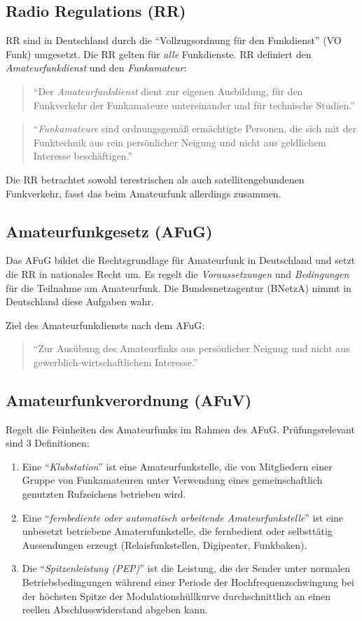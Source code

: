 \documentclass[11pt,BCOR=8.5mm]{scrartcl}
\begin{document}
\subsection{Radio Regulations (RR)}
RR sind in Deutschland durch die "`Vollzugsordnung für den Funkdienst"'
(VO Funk) umgesetzt. Die RR gelten für \emph{alle} Funkdienste.  
RR definiert den \emph{Amateurfunkdienst} und den \emph{Funkamateur}:
\begin{quote}
  "`Der \emph{Amateurfunkdienst} dient zur eigenen Ausbildung, für den
  Funkverkehr der Funkamateure untereinander und für technische
  Studien."'
\end{quote}

\begin{quote}
  "`\emph{Funkamateure} sind ordnungsgemäß ermächtigte Personen, die sich mit
  der Funktechnik aus rein persönlicher Neigung und nicht aus geldlichem
  Interesse beschäftigen."'
\end{quote}

Die RR betrachtet sowohl terestrischen als auch satellitengebundenen
Funkverkehr, fasst das beim Amateurfunk allerdings zusammen.

\subsection{Amateurfunkgesetz (AFuG)}\label{sub:amateurfunkgesetz}
Das AFuG bildet die Rechtsgrundlage für Amateurfunk in Deutschland und
setzt die RR in nationales Recht um. Es regelt die
\emph{Voraussetzungen} und \emph{Bedingungen} für die Teilnahme am
Amateurfunk. Die Bundesnetzagentur (BNetzA) nimmt in Deutschland diese
Aufgaben wahr.

Ziel des Amateurfunkdiensts nach dem AFuG:
\begin{quote}
  "`Zur Ausübung des Amateurfinks aus persönlicher Neigung und nicht aus
  gewerblich-wirtschaftlichem Interesse."'
\end{quote}

\subsection{Amateurfunkverordnung (AFuV)}\label{sub:amateurfunkverordnung}
Regelt die Feinheiten des Amateurfunks im Rahmen des AFuG.
Prüfungsrelevant sind 3 Definitionen:
\begin{enumerate}
  \item Eine "`\emph{Klubstation}"' ist eine Amateurfunkstelle, die von
	Mitgliedern einer Gruppe von Funkamateuren unter Verwendung eines
	gemeinschaftlich genutzten Rufzeichens betrieben wird.
  \item Eine "`\emph{fernbediente oder automatisch arbeitende
	Amateurfunkstelle}"' ist eine unbesetzt betriebene Amaterufunkstelle,
	die fernbedient oder selbsttätig Aussendungen erzeugt
	(Relaisfunkstellen, Digipeater, Funkbaken).
  \item Die "`\emph{Spitzenleistung (PEP)}"' ist die Leistung, die der
	Sender unter normalen Betriebsbedingungen während einer Periode der
	Hochfrequenzschwingung bei der höchsten Spitze der
	Modulationshüllkurve durchschnittlich an einen reellen
	Abschlusswiderstand abgeben kann.
\end{enumerate}
\end{document}
